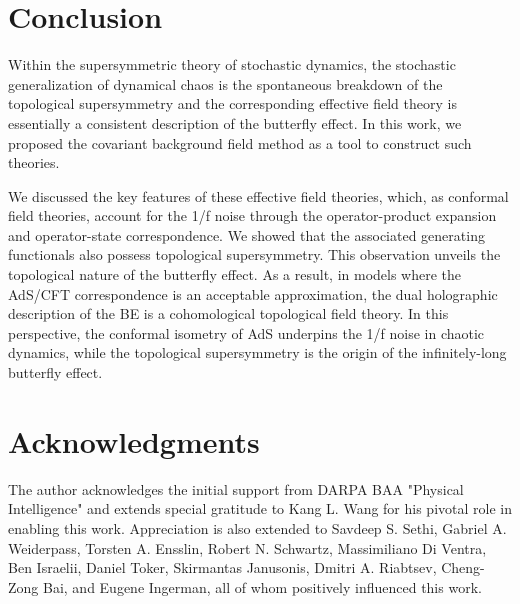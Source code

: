\documentclass[final,5p,10pt,times,twocolumn,year]{elsarticle}
\begin{document}
\section{Conclusion}\label{conclusion} %
Within the supersymmetric theory of stochastic dynamics, the stochastic generalization of dynamical chaos is the spontaneous breakdown of the topological supersymmetry and the corresponding effective field theory is essentially a consistent description of the butterfly effect. In this work, we proposed the covariant background field method as a tool to construct such theories. 

We discussed the key features of these effective field theories, which, as conformal field theories, account for the 1/f noise through the operator-product expansion and operator-state correspondence. We showed that the associated generating functionals also possess topological supersymmetry. This observation unveils the topological nature of the butterfly effect. As a result, in models where the AdS/CFT correspondence is an acceptable approximation, the dual holographic description of the BE is a cohomological topological field theory. In this perspective, the conformal isometry of AdS underpins the 1/f noise in chaotic dynamics, while the topological supersymmetry is the origin of the infinitely-long butterfly effect.



\section*{Acknowledgments}
The author acknowledges the initial support from DARPA BAA "Physical Intelligence" and extends special gratitude to Kang L. Wang for his pivotal role in enabling this work. Appreciation is also extended to Savdeep S. Sethi, Gabriel A. Weiderpass, Torsten A. Ensslin, Robert N. Schwartz, Massimiliano Di Ventra, Ben Israelii, Daniel Toker, Skirmantas Janusonis, Dmitri A. Riabtsev, Cheng-Zong Bai, and Eugene Ingerman, all of whom positively influenced this work.
\end{document}
